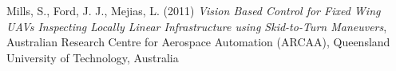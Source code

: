\begin{thebibliography}{25}
	Mills, S., Ford, J. J., Mejias, L. (2011)
	\emph{Vision Based Control for Fixed Wing UAVs Inspecting Locally Linear Infrastructure using Skid-to-Turn Maneuvers}, 
	Australian Research Centre for Aerospace Automation (ARCAA), Queensland University of Technology, Australia
	
	
	
\end{thebibliography}